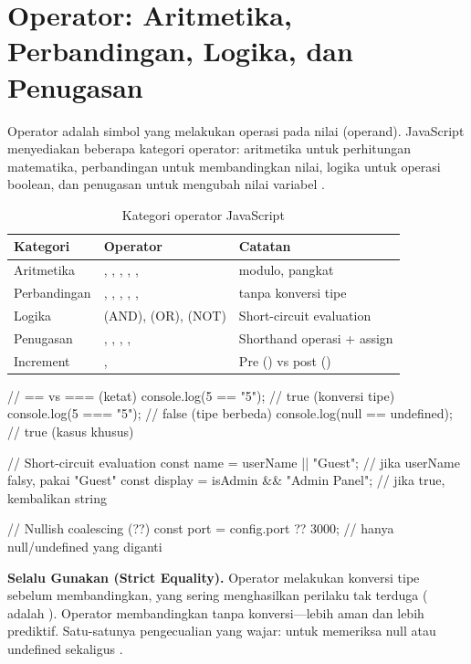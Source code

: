 ﻿\section{Operator: Aritmetika, Perbandingan, Logika, dan Penugasan}

Operator adalah simbol yang melakukan operasi pada nilai (operand). JavaScript menyediakan beberapa kategori operator: aritmetika untuk perhitungan matematika, perbandingan untuk membandingkan nilai, logika untuk operasi boolean, dan penugasan untuk mengubah nilai variabel \cite{jsInfo}.

\begin{table}[H]
\centering
\begin{tabular}{|P{2.5cm}|P{4.5cm}|P{5cm}|}
\hline
\textbf{Kategori} & \textbf{Operator} & \textbf{Catatan} \\
\hline
Aritmetika & \code{+}, \code{-}, \code{*}, \code{/}, \code{\%}, \code{**} & \code{\%} modulo, \code{**} pangkat \\
\hline
Perbandingan & \code{==}, \code{===}, \code{!=}, \code{!==}, \code{<}, \code{>} & \code{===} tanpa konversi tipe \\
\hline
Logika & \code{\&\&} (AND), \code{||} (OR), \code{!} (NOT) & Short-circuit evaluation \\
\hline
Penugasan & \code{=}, \code{+=}, \code{-=}, \code{*=}, \code{/=} & Shorthand operasi + assign \\
\hline
Increment & \code{++}, \code{--} & Pre () vs post () \\
\hline
\end{tabular}
\caption{Kategori operator JavaScript}
\end{table}

\begin{webcode}[language=JavaScript, caption={Operator perbandingan dan logika}]
// == vs === (ketat)
console.log(5 == "5");    // true  (konversi tipe)
console.log(5 === "5");   // false (tipe berbeda)
console.log(null == undefined); // true (kasus khusus)

// Short-circuit evaluation
const name = userName || "Guest"; // jika userName falsy, pakai "Guest"
const display = isAdmin && "Admin Panel"; // jika true, kembalikan string

// Nullish coalescing (??)
const port = config.port ?? 3000; // hanya null/undefined yang diganti
\end{webcode}

\begin{konsep}
\textbf{Selalu Gunakan \code{===} (Strict Equality).} Operator \code{==} melakukan konversi tipe sebelum membandingkan, yang sering menghasilkan perilaku tak terduga ( adalah ). Operator \code{===} membandingkan tanpa konversi---lebih aman dan lebih prediktif. Satu-satunya pengecualian yang wajar:  untuk memeriksa null atau undefined sekaligus \cite{mdnJsGuide}.
\end{konsep}


